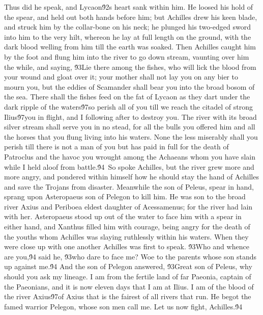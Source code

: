 {Thus did he speak, and Lycaon\'92s heart sank within him. He loosed his hold of the spear, and held out both hands before him; but Achilles drew his keen blade, and struck him by the collar-bone on his neck; he plunged his two-edged sword into him to the very hilt, whereon he lay at full length on the ground, with the dark blood welling from him till the earth was soaked. Then Achilles caught him by the foot and flung him into the river to go down stream, vaunting over him the while, and saying, \'93Lie there among the fishes, who will lick the blood from your wound and gloat over it; your mother shall not lay you on any bier to mourn you, but the eddies of Scamander shall bear you into the broad bosom of the sea. There shall the fishes feed on the fat of Lycaon as they dart under the dark ripple of the waters\'97so perish all of you till we reach the citadel of strong Ilius\'97you in flight, and I following after to destroy you. The river with its broad silver stream shall serve you in no stead, for all the bulls you offered him and all the horses that you flung living into his waters. None the less miserably shall you perish till there is not a man of you but has paid in full for the death of Patroclus and the havoc you wrought among the Achaeans whom you have slain while I held aloof from battle.\'94\
So spoke Achilles, but the river grew more and more angry, and pondered within himself how he should stay the hand of Achilles and save the Trojans from disaster. Meanwhile the son of Peleus, spear in hand, sprang upon Asteropaeus son of Pelegon to kill him. He was son to the broad river Axius and Periboea eldest daughter of Acessamenus; for the river had lain with her. Asteropaeus stood up out of the water to face him with a spear in either hand, and Xanthus filled him with courage, being angry for the death of the youths whom Achilles was slaying ruthlessly within his waters. When they were close up with one another Achilles was first to speak. \'93Who and whence are you,\'94 said he, \'93who dare to face me? Woe to the parents whose son stands up against me.\'94 And the son of Pelegon answered, \'93Great son of Peleus, why should you ask my lineage. I am from the fertile land of far Paeonia, captain of the Paeonians, and it is now eleven days that I am at Ilius. I am of the blood of the river Axius\'97of Axius that is the fairest of all rivers that run. He begot the famed warrior Pelegon, whose son men call me. Let us now fight, Achilles.\'94\
}
